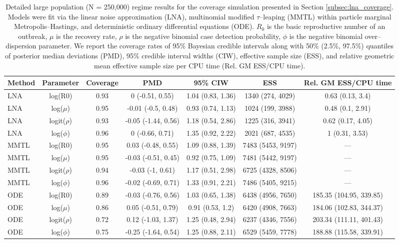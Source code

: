 \begin{sidewaystable}[ht]
	\small
	\centering
	\begin{tabular}{lcccccc}
		\hline
		Method & Parameter & Coverage & PMD & 95\% CIW & ESS & Rel. GM ESS/CPU time \\ 
		\hline
		LNA & log(R0) & 0.93 & 0 (-0.51, 0.55) & 1.04 (0.83, 1.36) & 1340 (274, 4029) & 0.63 (0.13, 3.4) \\ 
		LNA & log($\mu$) & 0.95 & -0.01 (-0.5, 0.48) & 0.93 (0.74, 1.13) & 1024 (199, 3988) & 0.48 (0.1, 2.91) \\ 
		LNA & logit($\rho$) & 0.93 & -0.05 (-1.44, 0.56) & 1.18 (0.54, 2.86) & 1225 (316, 3941) & 0.62 (0.17, 4.05) \\ 
		LNA & log($\phi$) & 0.96 & 0 (-0.66, 0.71) & 1.35 (0.92, 2.22) & 2021 (687, 4535) & 1 (0.31, 3.53) \\ 
		MMTL & log(R0) & 0.95 & 0.03 (-0.48, 0.55) & 1.09 (0.88, 1.39) & 7483 (5453, 9197) & --- \\ 
		MMTL & log($\mu$) & 0.95 & -0.03 (-0.51, 0.45) & 0.92 (0.75, 1.09) & 7481 (5442, 9197) & --- \\ 
		MMTL & logit($\rho$) & 0.94 & -0.03 (-1, 0.61) & 1.17 (0.51, 2.98) & 6725 (4328, 8506) & --- \\ 
		MMTL & log($\phi$) & 0.96 & -0.02 (-0.69, 0.71) & 1.33 (0.91, 2.21) & 7486 (5405, 9215) & --- \\ 
		ODE & log(R0) & 0.89 & -0.03 (-0.76, 0.56) & 1.03 (0.65, 1.38) & 6438 (4956, 7650) & 185.35 (104.95, 339.85) \\ 
		ODE & log($\mu$) & 0.86 & 0.05 (-0.51, 0.79) & 0.91 (0.53, 1.2) & 6420 (4908, 7663) & 184.06 (102.83, 344.37) \\ 
		ODE & logit($\rho$) & 0.72 & 0.12 (-1.03, 1.37) & 1.25 (0.48, 2.94) & 6237 (4346, 7556) & 203.34 (111.11, 401.43) \\ 
		ODE & log($\phi$) & 0.75 & -0.25 (-1.64, 0.54) & 1.25 (0.88, 2.11) & 6529 (5459, 7778) & 188.88 (115.58, 339.91) \\ 
		\hline
	\end{tabular}
	\caption{Detailed large population (N = 250,000) regime results for the coverage simulation presented in Section \ref{subsec:lna_coverage}. Models were fit via the linear noise approximation (LNA), multinomial modified $ \tau $--leaping (MMTL) within particle marginal Metropolis--Hastings, and deterministic ordinary differential equations (ODE). $ R_0 $ is the basic reproductive number of an outbreak, $ \mu $ is the recovery rate, $ \rho $ is the negative binomial case detection probability, $ \phi $ is the negative binomial over--dispersion parameter. We report the coverage rates of 95\% Bayesian credible intervals along with 50\% (2.5\%, 97.5\%) quantiles of posterior median deviations (PMD), 95\% credible interval widths (CIW), effective sample size (ESS), and relative geometric mean effective sample size per CPU time (Rel. GM ESS/CPU time).}
\end{sidewaystable}	

